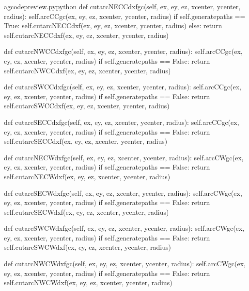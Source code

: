 \documentclass{ltxdoc}
\begin{document}
\lstset{firstnumber=\thegcpy}
\begin{writecode}{a}{gcodepreview.py}{python}
    def cutarcNECCdxfgc(self, ex, ey, ez, xcenter, ycenter, radius):
        self.arcCCgc(ex, ey, ez, xcenter, ycenter, radius)
        if self.generatepaths == True:
            self.cutarcNECCdxf(ex, ey, ez, xcenter, ycenter, radius)
        else:
            return self.cutarcNECCdxf(ex, ey, ez, xcenter, ycenter, radius)

    def cutarcNWCCdxfgc(self, ex, ey, ez, xcenter, ycenter, radius):
        self.arcCCgc(ex, ey, ez, xcenter, ycenter, radius)
        if self.generatepaths == False:
            return self.cutarcNWCCdxf(ex, ey, ez, xcenter, ycenter, radius)

    def cutarcSWCCdxfgc(self, ex, ey, ez, xcenter, ycenter, radius):
        self.arcCCgc(ex, ey, ez, xcenter, ycenter, radius)
        if self.generatepaths == False:
            return self.cutarcSWCCdxf(ex, ey, ez, xcenter, ycenter, radius)

    def cutarcSECCdxfgc(self, ex, ey, ez, xcenter, ycenter, radius):
        self.arcCCgc(ex, ey, ez, xcenter, ycenter, radius)
        if self.generatepaths == False:
            return self.cutarcSECCdxf(ex, ey, ez, xcenter, ycenter, radius)

    def cutarcNECWdxfgc(self, ex, ey, ez, xcenter, ycenter, radius):
        self.arcCWgc(ex, ey, ez, xcenter, ycenter, radius)
        if self.generatepaths == False:
            return self.cutarcNECWdxf(ex, ey, ez, xcenter, ycenter, radius)

    def cutarcSECWdxfgc(self, ex, ey, ez, xcenter, ycenter, radius):
        self.arcCWgc(ex, ey, ez, xcenter, ycenter, radius)
        if self.generatepaths == False:
            return self.cutarcSECWdxf(ex, ey, ez, xcenter, ycenter, radius)

    def cutarcSWCWdxfgc(self, ex, ey, ez, xcenter, ycenter, radius):
        self.arcCWgc(ex, ey, ez, xcenter, ycenter, radius)
        if self.generatepaths == False:
            return self.cutarcSWCWdxf(ex, ey, ez, xcenter, ycenter, radius)

    def cutarcNWCWdxfgc(self, ex, ey, ez, xcenter, ycenter, radius):
        self.arcCWgc(ex, ey, ez, xcenter, ycenter, radius)
        if self.generatepaths == False:
            return self.cutarcNWCWdxf(ex, ey, ez, xcenter, ycenter, radius)

\end{writecode}
\addtocounter{gcpy}{42}
\end{document}
